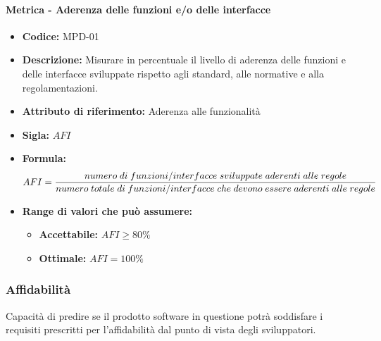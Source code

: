               \paragraph{Metrica - Aderenza delle funzioni e/o delle interfacce} 
              \begin{itemize}
          \item  \textbf{Codice:} MPD-01
        \item    \textbf{Descrizione:} Misurare in percentuale il livello di aderenza delle funzioni e delle interfacce sviluppate rispetto agli standard, alle normative e alla regolamentazioni.
          \item  \textbf{Attributo di riferimento:} Aderenza alle funzionalità 
        \item    \textbf{Sigla:} $AFI$
         \item   \textbf{Formula:} $$AFI = {numero \; di \; funzioni/interfacce \; sviluppate \; aderenti \; alle \; regole \over numero \; totale \; di \; funzioni/interfacce \; che \; devono \; essere \; aderenti \; alle \; regole}$$

                \item \textbf{Range di valori che può assumere:}
                \begin{itemize}
                    \item \textbf{Accettabile:} $AFI  \geq 80\% $
                    \item \textbf{Ottimale:} $AFI = 100\%$
                \end{itemize}
            \end{itemize}
              
  \subsubsection{Affidabilità} 
  Capacità di predire se il prodotto software in questione potrà soddisfare i requisiti prescritti per l'affidabilità dal punto di vista degli sviluppatori.
